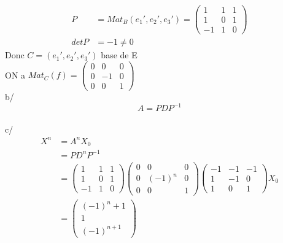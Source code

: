 \documentclass{article}
\begin{document}
\begin{align*}
    P &= Mat_B(e_1', e_2',e_3') = \begin{pmatrix}
        1&1&1\\1&0&1\\-1&1&0
    \end{pmatrix}\\
    det P &= -1 \neq 0
\end{align*}
Donc \(C = (e_1', e_2',e_3')\) base de E\\
ON a \(Mat_C(f) = \begin{pmatrix}
    0&0&0\\0&-1&0\\0&0&1
\end{pmatrix}\)\\
b/ \begin{equation*}
    A = PDP^{-1}
\end{equation*}\\
c/ \begin{align*}
    X^n &= A^nX_0\\
    &= PD^nP^{-1}\\
    &= \begin{pmatrix}
        1&1&1\\1&0&1\\-1&1&0
    \end{pmatrix}\begin{pmatrix}
        0&0&0\\0&(-1)^n&0\\0&0&1
    \end{pmatrix}\begin{pmatrix}
        -1&-1&-1\\1&-1&0\\1&0&1
    \end{pmatrix}X_0\\
    &= \begin{pmatrix}
        (-1)^n+1\\1\\(-1)^{n+1}
    \end{pmatrix}
\end{align*}
\end{document}
